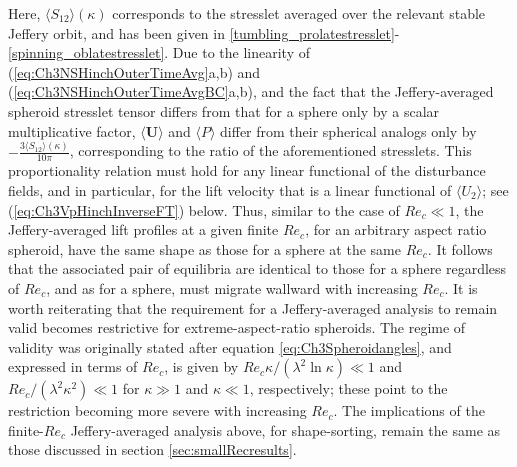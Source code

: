 \documentclass{jfm}
\begin{document}
Here, $\langle S_{12}\rangle(\kappa)$ corresponds to the stresslet averaged over the relevant stable Jeffery orbit, and has been given in \eqref{tumbling_prolatestresslet}-\eqref{spinning_oblatestresslet}. Due to the linearity of (\ref{eq:Ch3NSHinchOuterTimeAvg}a,b) and (\ref{eq:Ch3NSHinchOuterTimeAvgBC}a,b), and the fact that the Jeffery-averaged spheroid stresslet tensor differs from that for a sphere only by a scalar multiplicative factor, $\langle \bm{U} \rangle$ and $\langle P \rangle$ differ from their spherical analogs only by $-\frac{3\langle S_{12}\rangle(\kappa)}{10\pi}$, corresponding to the ratio of the aforementioned stresslets. This proportionality relation must hold for any linear functional of the disturbance fields, and in particular, for the lift velocity that is a linear functional of $\langle U_2 \rangle$; see (\ref{eq:Ch3VpHinchInverseFT}) below. Thus, similar to the case of $Re_c\ll1$, the Jeffery-averaged lift profiles at a given finite $Re_c$, for an arbitrary aspect ratio spheroid, have the same shape as those for a sphere at the same $Re_c$. It follows that the associated pair of equilibria are identical to those for a sphere regardless of $Re_c$, and as for a sphere\citep{schonberghinch1989}, must migrate wallward with increasing $Re_c$. It is worth reiterating that the requirement for a Jeffery-averaged analysis to remain valid becomes restrictive for extreme-aspect-ratio spheroids. The regime of validity was originally stated after equation \eqref{eq:Ch3Spheroidangles}, and expressed in terms of $Re_c$, is given by $Re_c\kappa/(\lambda^2\ln \kappa) \ll 1$ and $Re_c/(\lambda^2\kappa^2) \ll 1$ for $\kappa \gg 1$ and $\kappa \ll 1$, respectively; these point to the restriction becoming more severe with increasing $Re_c$. The implications of the finite-$Re_c$ Jeffery-averaged analysis above, for shape-sorting, remain the same as those discussed in section \ref{sec:smallRecresults}.
\end{document}
